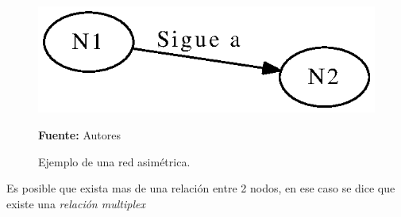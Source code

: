 \begin{figure}[!htb]
  \begin{center}
    \includegraphics{./imagenes/Red_asimetrica.eps}
    \caption{Ejemplo de una red asimétrica.}
    \label{fig:asimetrica}
    \textbf{Fuente:}  Autores
  \end{center}
\end{figure}

Es posible que exista mas de una relación entre 2 nodos, en ese caso se dice que existe una \textit{relación multiplex} \cite[Cap.2]{cap_sna}








